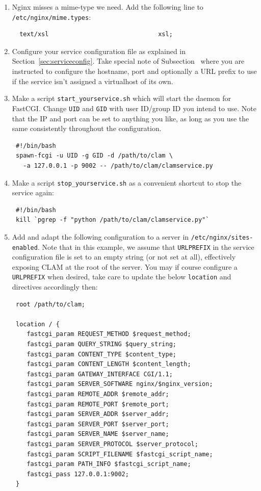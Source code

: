 \documentclass[a4paper,12pt]{report}
\begin{document}
\begin{enumerate}
\item Nginx misses a mime-type we need. Add the following line to \texttt{/etc/nginx/mime.types}:
\begin{verbatim}
  text/xsl                              xsl;
\end{verbatim}

\item Configure your service configuration file as explained in Section~\ref{sec:serviceconfig}. Take special note of Subsection~\label{sec:sadmin} where you are instructed to configure the hostname, port and optionally a URL prefix to use if the service isn't assigned a virtualhost of its own.

\item Make a script \texttt{start\_yourservice.sh} which will start the daemon for FastCGI. Change \texttt{UID} and \texttt{GID} with user ID/group ID you intend to use. Note that the IP and port can be set to anything you like, as long as you use the same consistently throughout the configuration.
\begin{verbatim}
 #!/bin/bash
 spawn-fcgi -u UID -g GID -d /path/to/clam \
   -a 127.0.0.1 -p 9002 -- /path/to/clam/clamservice.py
\end{verbatim}

\item Make a script \texttt{stop\_yourservice.sh} as a convenient shortcut to stop the service again:
\begin{verbatim}
 #!/bin/bash
 kill `pgrep -f "python /path/to/clam/clamservice.py"`
\end{verbatim}

\item Add and adapt the following configuration to a server in \texttt{/etc/nginx/sites-enabled}. Note that in this example, we assume that \texttt{URLPREFIX} in the service configuration file is set to an empty string (or not set at all), effectively exposing CLAM at the root of the server. You may if course configure a \texttt{URLPREFIX} when desired, take care to update the below \texttt{location} and directives accordingly then:
\begin{verbatim}
 root /path/to/clam;

 location / {
    fastcgi_param REQUEST_METHOD $request_method;
    fastcgi_param QUERY_STRING $query_string;
    fastcgi_param CONTENT_TYPE $content_type;
    fastcgi_param CONTENT_LENGTH $content_length;
    fastcgi_param GATEWAY_INTERFACE CGI/1.1;
    fastcgi_param SERVER_SOFTWARE nginx/$nginx_version;
    fastcgi_param REMOTE_ADDR $remote_addr;
    fastcgi_param REMOTE_PORT $remote_port;
    fastcgi_param SERVER_ADDR $server_addr;
    fastcgi_param SERVER_PORT $server_port;
    fastcgi_param SERVER_NAME $server_name;
    fastcgi_param SERVER_PROTOCOL $server_protocol;
    fastcgi_param SCRIPT_FILENAME $fastcgi_script_name;
    fastcgi_param PATH_INFO $fastcgi_script_name;
    fastcgi_pass 127.0.0.1:9002;
 }


\end{verbatim}
\end{enumerate}
\end{document}

